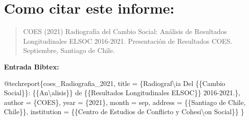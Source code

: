 \documentclass[
  12pt,
]{book}
\newenvironment{Shaded}{\begin{snugshade}}{\end{snugshade}}
\newcommand{\NormalTok}[1]{#1}
\newcommand{\OtherTok}[1]{\textcolor[rgb]{0.56,0.35,0.01}{#1}}
\newcommand{\SpecialCharTok}[1]{\textcolor[rgb]{0.00,0.00,0.00}{#1}}
\newcommand{\StringTok}[1]{\textcolor[rgb]{0.31,0.60,0.02}{#1}}
\begin{document}
\hypertarget{como-citar-este-informe}{%
\chapter*{Como citar este informe:}\label{como-citar-este-informe}}

\begin{quote}
COES (2021) Radiografía del Cambio Social: Análisis de Resultados Longitudinales ELSOC 2016-2021. Presentación de Resultados COES. Septiembre, Santiago de Chile.
\end{quote}

\textbf{Entrada Bibtex:}

\begin{Shaded}
\begin{Highlighting}[]
\SpecialCharTok{@}\NormalTok{techreport\{coes\_Radiografia\_2021,}
\NormalTok{  title }\OtherTok{=}\NormalTok{ \{Radiograf\textbackslash{}}\StringTok{\textquotesingle{}ia Del \{\{Cambio Social\}\}: \{\{An}\SpecialCharTok{\textbackslash{}\textquotesingle{}}\StringTok{alisis\}\} de \{\{Resultados Longitudinales ELSOC\}\} 2016{-}2021.\},}
\StringTok{  author = \{COES\},}
\StringTok{  year = \{2021\},}
\StringTok{  month = sep,}
\StringTok{  address = \{\{Santiago de Chile, Chile\}\},}
\StringTok{  institution = \{\{Centro de Estudios de Conflicto y Cohesi}\SpecialCharTok{\textbackslash{}\textquotesingle{}}\StringTok{on Social\}\}}
\StringTok{\}}
\end{Highlighting}
\end{Shaded}
\end{document}
